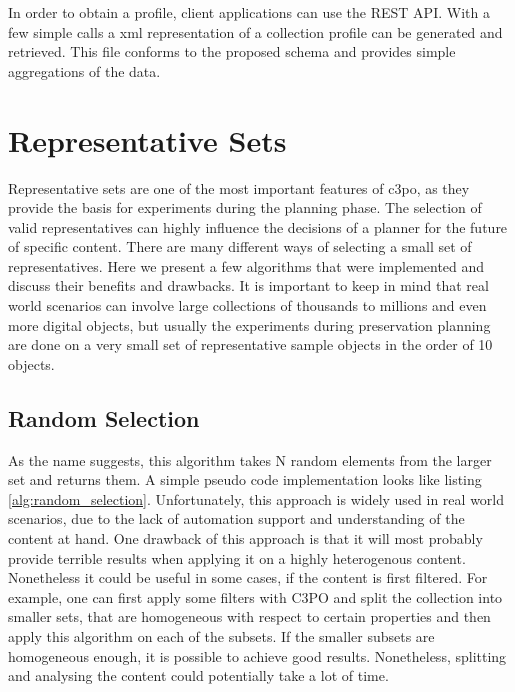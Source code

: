 In order to obtain a profile, client applications can use the REST API. With a few simple calls a xml representation of a collection profile can be generated and retrieved. This file conforms to the proposed schema and provides simple aggregations of the data.
 
\section{Representative Sets}
Representative sets are one of the most important features of c3po, as they provide the basis for experiments during the planning phase. The selection of valid representatives can highly influence the decisions of a planner for the future of specific content. There are many different ways of selecting a small set of representatives.
Here we present a few algorithms that were implemented and discuss their benefits and drawbacks. It is important to keep in mind that real world scenarios can involve large collections of thousands to millions and even more digital objects, but usually the experiments during preservation planning are done on a very small set of representative sample objects in the order of 10 objects. 

\subsection{Random Selection}
As the  name suggests, this algorithm takes N random elements from the larger set and returns them. A simple pseudo code implementation looks like listing \ref{alg:random_selection}. Unfortunately, this approach is widely used in real world scenarios, due to the lack of automation support and understanding of the content at hand. One drawback of this approach is that it will most probably provide terrible results when applying it on a highly heterogenous content.
Nonetheless it could be useful in some cases, if the content is first filtered. For example, one can first apply some filters with C3PO and split the collection into smaller sets, that are homogeneous with respect to certain properties and then apply this algorithm on each of the subsets. If the smaller subsets are homogeneous enough, it is possible to achieve good results. Nonetheless, splitting and analysing the content could potentially take a lot of time.

